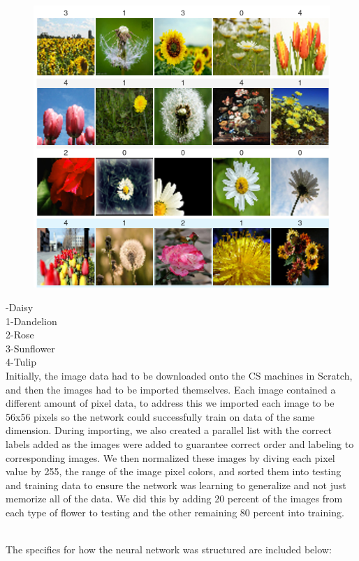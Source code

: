 \documentclass{article}
\begin{document}
\begin{figure}
\includegraphics[width=.8\linewidth]{FlowersRan.png} 
\label{fig:wrapfig}
\end{figure}
-Daisy\\
1-Dandelion\\
2-Rose\\
3-Sunflower\\
4-Tulip\\


Initially, the image data had to be downloaded onto the CS machines in Scratch, and then the images had to be imported themselves. Each image contained a different amount of pixel data, to address this we imported each image to be 56x56 pixels so the network could successfully train on data of the same dimension. During importing, we also created a parallel list with the correct labels added as the images were added to guarantee correct order and labeling to corresponding images. We then normalized these images by diving each pixel value by 255, the range of the image pixel colors, and sorted them into testing and training data to ensure the network was learning to generalize and not just memorize all of the data. We did this by adding 20 percent of the images from each type of flower to testing and the other remaining 80 percent into training. 

\hfill \\

\noindent
The specifics for how the neural network was structured are included below:\\
\hfill \\
\noindent
\end{document}
